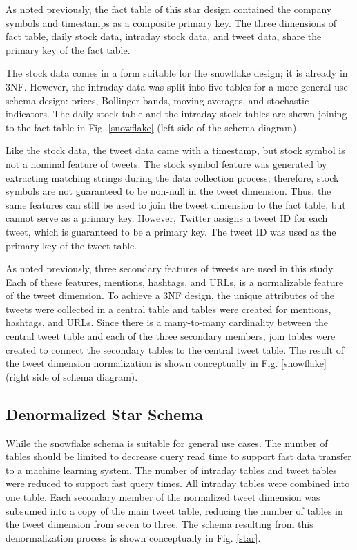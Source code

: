 \documentclass[journal]{IEEEtran}
\begin{document}
As noted previously, the fact table of this star design contained the
 company symbols and timestamps as a composite primary key.
The three dimensions of fact table, daily stock data, intraday stock data, and 
 tweet data, share the primary key of the fact table.

The stock data comes in a form suitable for the snowflake design; 
 it is already in 3NF.
However, the intraday data was split into five tables for a more 
 general use schema design: prices, Bollinger bands, moving averages,
 and stochastic indicators.
The daily stock table and the intraday stock tables are shown joining to the 
 fact table in Fig. \ref{snowflake} (left side of the schema diagram).

Like the stock data, the tweet data came with a timestamp, but stock symbol
 is not a nominal feature of tweets.
The stock symbol feature was generated by extracting matching strings
 during the data collection process; therefore, stock symbols are not
 guaranteed to be non-null in the tweet dimension.
Thus, the same features can still be used to join the tweet dimension to the 
fact table, but cannot serve as a primary key.
However, Twitter assigns a tweet ID for each tweet, which is guaranteed to be
 a primary key.
The tweet ID was used as the primary key of the tweet table.

As noted previously, three secondary features of tweets are used in this study.
Each of these features, mentions, hashtags, and URLs, is a normalizable
 feature of the tweet dimension.
To achieve a 3NF design, the unique attributes of the tweets were collected
 in a central table and tables were created for mentions, hashtags, and URLs.
Since there is a many-to-many cardinality between the central tweet table and each of 
 the three secondary members, join tables were created to connect the secondary tables 
 to the central tweet table. 
The result of the tweet dimension normalization is shown conceptually
 in Fig. \ref{snowflake} (right side of schema diagram).

\subsection{Denormalized Star Schema}

While the snowflake schema is suitable for general use cases.
The number of tables should be limited to decrease query read time to support
 fast data transfer to a machine learning system.
The number of intraday tables and tweet tables were reduced to support
 fast query times.
All intraday tables were combined into one table. 
Each secondary member of the normalized tweet dimension was
 subsumed into a copy of the main tweet table, reducing the number of tables
 in the tweet dimension from seven to three.
The schema resulting from this denormalization process is shown
 conceptually in Fig. \ref{star}.
\end{document}
